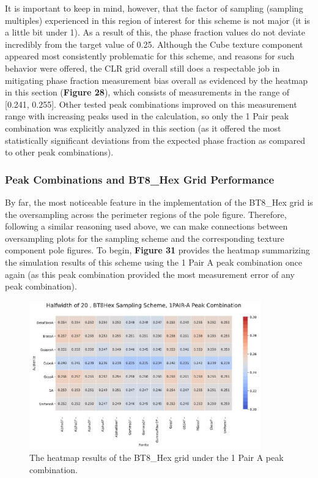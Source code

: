 \documentclass[10pt]{article}
\begin{document}
It is important to keep in mind, however, that the factor of sampling (sampling multiples) experienced in this region of interest for this scheme is not major (it is a little bit under 1). As a result of this,
the phase fraction values do not deviate incredibly from the target value of 0.25. Although the Cube texture component appeared most consistently problematic for this scheme, and reasons 
for such behavior were offered, the CLR grid overall still does a respectable job in mitigating phase fraction measurement bias overall as evidenced by the heatmap in this section (\textbf{Figure 28}), which
consists of measurements in the range of [0.241, 0.255]. Other tested peak combinations improved on this measurement range with increasing peaks used in the calculation, so only the 1 Pair peak combination was explicitly analyzed in this section 
(as it offered the most statistically significant deviations from the expected phase fraction as compared to other peak combinations).

\subsubsection{Peak Combinations and BT8\_Hex Grid Performance}
By far, the most noticeable feature in the implementation of the BT8\_Hex grid is the oversampling across the perimeter regions of the pole figure. Therefore, following a similar reasoning used above, we can make connections between oversampling plots for the 
sampling scheme and the corresponding texture component pole figures. To begin, \textbf{Figure 31} provides the heatmap summarizing the simulation 
results of this scheme using the 1 Pair A peak combination once again (as this peak combination provided the most measurement error of any peak combination).
\begin{figure}[h]
    \centering
    \includegraphics[width=10cm]{fig31}
    \caption{\label{tab1}The heatmap results of the BT8\_Hex grid under the 1 Pair A peak combination.} 
    \end{figure}
\end{document}
